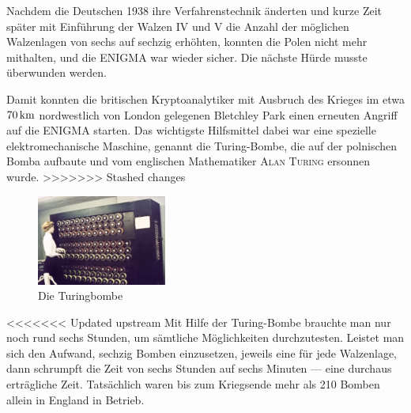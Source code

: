 \documentclass[%
<<<<<<< Updated upstream
11pt,%
twoside,%
titlepage,%
german,%
headsepline%
]{scrartcl}
\begin{document}
Nachdem die Deutschen 1938 ihre Verfahrenstechnik änderten und kurze Zeit später mit Einführung der Walzen IV und V die Anzahl der möglichen Walzenlagen von sechs auf sechzig erhöhten, konnten die Polen nicht mehr mithalten, und die ENIGMA war wieder sicher. Die nächste Hürde musste überwunden werden.

Damit konnten die britischen Kryptoanalytiker mit Ausbruch des Krieges im etwa $\unit[70]{km}$ nordwestlich von London gelegenen Bletchley Park einen erneuten Angriff auf die ENIGMA starten. Das wichtigste Hilfsmittel dabei war eine spezielle elektromechanische Maschine, genannt die Turing-Bombe, die auf der polnischen Bomba aufbaute und vom englischen Mathematiker \textsc{Alan Turing} ersonnen wurde.
>>>>>>> Stashed changes

\begin{figure}
\vspace{0pt}
\begin{center}
\includegraphics[width=0.38\textwidth]{pictures/turingbombe.jpg}
\caption{Die Turingbombe}
\end{center}
\vspace{0pt}
\end{figure}
<<<<<<< Updated upstream
Mit Hilfe der Turing-Bombe brauchte man nur noch rund sechs Stunden, um sämtliche Mög\-lich\-kei\-ten durchzutesten. Leistet man sich den Aufwand, sechzig Bomben einzusetzen, jeweils eine für jede Walzenlage, dann schrumpft die Zeit von sechs Stunden auf sechs Minuten --- eine durchaus erträgliche Zeit. Tatsächlich waren bis zum Kriegsende mehr als 210 Bomben allein in England in Betrieb.
\end{document}
